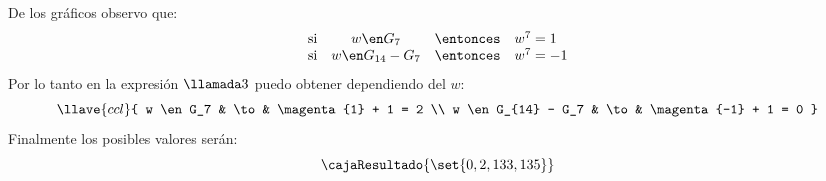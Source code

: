 De los gráficos observo que:
$$
  \begin{array}{rccl}
    \text{si} & w \en G_7          & \entonces & w^7 = 1  \\
    \text{si} & w \en G_{14} - G_7 & \entonces & w^7 = -1
  \end{array}
$$
Por lo tanto en la expresión $\llamada3$ puedo obtener dependiendo del $w$:
$$
  \llave{ccl}{
    w \en G_7          & \to & \magenta{1} + 1 = 2  \\
    w \en G_{14} - G_7 & \to & \magenta{-1} + 1 = 0
  }
$$
Finalmente los posibles valores serán:
$$
  \cajaResultado{
    \set{0,2,133, 135}
  }
$$

\begin{aportes}
  \item {}
\end{aportes}

